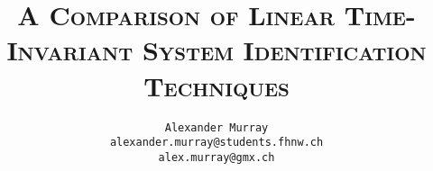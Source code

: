 \pretitle{\begin{center}\Huge\bfseries}
\posttitle{\par\end{center}\vskip 0.5em}
\preauthor{\begin{center}\Large\ttfamily}
\postauthor{\end{center}}
\predate{\par\large\centering}
\postdate{\par}

\author{%
    \vspace{5mm}
    \texttt{Alexander Murray}\\
    \vspace{2mm}
    \small{\texttt{alexander.murray@students.fhnw.ch}}\\
    \small{\texttt{alex.murray@gmx.ch}}
}

\title{
    \vspace{20mm}
    \Huge{\textsc{A Comparison of Linear Time-Invariant System Identification Techniques}}
}


